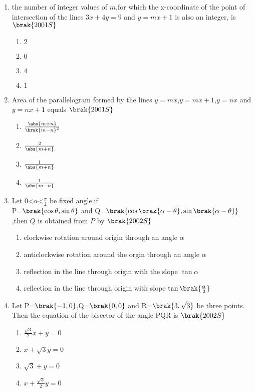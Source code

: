 \begin{enumerate}
\begin{enumerate}
\end{enumerate}
\item the number of integer values of $m$,for which the x-coordinate of the point of intersection of the lines $3x+4y=9$ and $y=mx+1$ is also an integer, is 
\hfill{$\brak{2001S}$}
\begin{enumerate}
    
    \item $2$
    \item $0$
     \item $4$
     \item $1$
    
\end{enumerate}
\item Area of the parallelogram formed by the lines $y=mx$,$y=mx+1$,$y=nx$ and $y=nx+1$ equals
\hfill{$\brak{2001S}$}
\begin{enumerate}
    
     \item $\frac{\abs{m+n}}{\brak{m-n}^2}$
     \item $\frac{2}{\abs{m+n}}$
     \item $\frac{1}{\abs{m+n}}$
     \item $\frac{1}{\abs{m-n}}$
    
\end{enumerate}
\item Let $0$\textless $\alpha $\textless $\frac{\pi}{2}$ be fixed angle.if\\
P=$\brak{\cos\theta,\sin\theta}$ and Q=$\brak{\cos\brak{\alpha-\theta},\sin\brak{\alpha-\theta}}$,then $Q$ is obtained from $P$ by
\hfill{$\brak{2002S}$}
\begin{enumerate}
    \item clockwise rotation around origin through an angle $\alpha$
    \item anticlockwise rotation around the orgin through an angle $\alpha$
    \item reflection in the line through origin with the slope $\tan\alpha$
    \item reflection in the line through origin with slope $\tan\brak{\frac{\alpha}{2}}$
\end{enumerate}
\item Let P=$\brak{-1,0}$,Q=$\brak{0,0}$ and R=$\brak{3,\sqrt{3}}$ be three points. Then the equation of the bisector of the angle PQR is 
\hfill{$\brak{2002S}$}
\begin{enumerate}
    
        \item $\frac{\sqrt{3}}{2}x+y=0$
        \item $x+\sqrt{3}y=0$
        \item $\sqrt{3}+y=0$
        \item $x+\frac{\sqrt{3}}{2}y=0$
    

\end{enumerate}
\end{enumerate}
